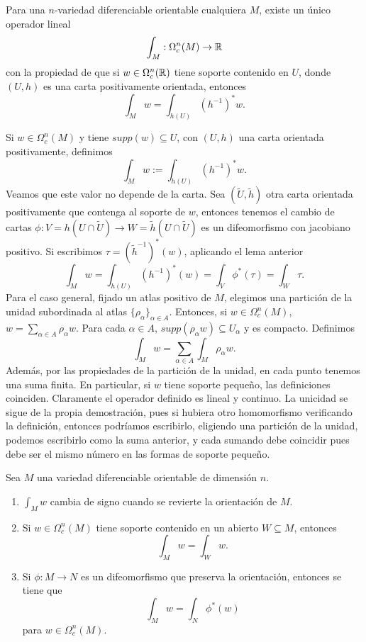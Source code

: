 \documentclass[CV.tex]{subfiles}
\begin{document}
\begin{prop}
Para una $n$-variedad diferenciable orientable cualquiera $M$, existe un único operador lineal 
\[
\int_M:\Omega_c^n(M)\to\mathbb{R}
\]
con la propiedad de que si $w\in\Omega_c^n(\mathbb{R})$ tiene soporte contenido en $U$, donde $(U,h)$ es una carta positivamente orientada, entonces
\[
\int_M w=\int_{h(U)}(h^{-1})^*w.
\]
\end{prop}
\begin{dem}
Si $w\in\Omega^n_c(M)$ y tiene $supp(w)\subseteq U$, con $(U,h)$ una carta orientada positivamente, definimos
\[
\int_M w:=\int_{h(U)}(h^{-1})^*w.
\]
Veamos que este valor no depende de la carta. Sea $(\tilde{U}, \tilde{h})$ otra carta orientada positivamente que contenga al soporte de $w$, entonces tenemos el cambio de cartas $\phi:V=h(U\cap\widetilde{U})\to W=\widetilde{h}(U\cap\widetilde{U})$ es un difeomorfismo con jacobiano positivo. Si escribimos $\tau=(\widetilde{h}^{-1})^*(w)$, aplicando el lema anterior
\[
\int_M w=\int_{h(U)}(h^{-1})^*(w)=\int_V\phi^*(\tau)=\int_W\tau.
\] 
Para el caso general, fijado un atlas positivo de $M$, elegimos una partición de la unidad subordinada al atlas $\{\rho_\alpha\}_{\alpha\in A}$. Entonces, si $w\in\Omega_c^n(M)$, $w=\sum_{\alpha\in A}\rho_\alpha w$. Para cada $\alpha\in A$, $supp(\rho_\alpha w)\subseteq U_\alpha$ y es compacto. Definimos
\[
\int_M w=\sum_{\alpha\in A}\int_M\rho_\alpha w. 
\]
Además, por las propiedades de la partición de la unidad, en cada punto tenemos una suma finita. En particular, si $w$ tiene soporte pequeño, las definiciones coinciden. Claramente el operador definido es lineal y continuo. La unicidad se sigue de la propia demostración, pues si hubiera otro homomorfismo verificando la definición, entonces podríamos escribirlo, eligiendo una partición de la unidad, podemos escribirlo como la suma anterior, y cada sumando debe coincidir pues debe ser el mismo número en las formas de soporte pequeño.
\QED
\end{dem}
\begin{lemma}
Sea $M$ una variedad diferenciable orientable de dimensión $n$.
\begin{enumerate}
\item  $\int_M w$ cambia de signo cuando se revierte la orientación de $M$.
\item Si $w\in \Omega_c^n(M)$ tiene soporte contenido en un abierto $W\subseteq M$, entonces
\[
\int_M w=\int_W w.
\]
\item Si $\phi:M\to N$ es un difeomorfismo que preserva la orientación, entonces se tiene que
\[
\int_M w=\int_N\phi^*(w)
\]
para $w\in\Omega_c^n(M)$. 
\end{enumerate}
\end{lemma}
\end{document}
